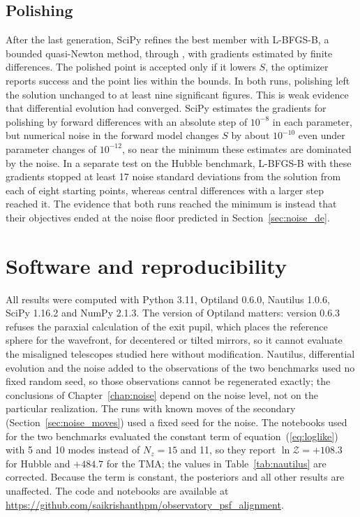 \subsection{Polishing}
After the last generation, SciPy refines the best member with L-BFGS-B, a bounded quasi-Newton method, through , with gradients estimated by finite differences. The polished point is accepted only if it lowers $S$, the optimizer reports success and the point lies within the bounds. In both runs, polishing left the solution unchanged to at least nine significant figures. This is weak evidence that differential evolution had converged. SciPy estimates the gradients for polishing by forward differences with an absolute step of $10^{-8}$ in each parameter, but numerical noise in the forward model changes $S$ by about $10^{-10}$ even under parameter changes of $10^{-12}$, so near the minimum these estimates are dominated by the noise. In a separate test on the Hubble benchmark, L-BFGS-B with these gradients stopped at least 17 noise standard deviations from the solution from each of eight starting points, whereas central differences with a larger step reached it. The evidence that both runs reached the minimum is instead that their objectives ended at the noise floor predicted in Section~\ref{sec:noise_de}.

\section{Software and reproducibility}\label{sec:software}
All results were computed with Python 3.11, Optiland 0.6.0, Nautilus 1.0.6, SciPy 1.16.2 and NumPy 2.1.3. The version of Optiland matters: version 0.6.3 refuses the paraxial calculation of the exit pupil, which places the reference sphere for the wavefront, for decentered or tilted mirrors, so it cannot evaluate the misaligned telescopes studied here without modification. Nautilus, differential evolution and the noise added to the observations of the two benchmarks used no fixed random seed, so those observations cannot be regenerated exactly; the conclusions of Chapter~\ref{chap:noise} depend on the noise level, not on the particular realization. The runs with known moves of the secondary (Section~\ref{sec:noise_moves}) used a fixed seed for the noise. The notebooks used for the two benchmarks evaluated the constant term of equation~(\ref{eq:loglike}) with 5 and 10 modes instead of $N_z=15$ and 11, so they report $\ln\mathcal{Z}=+108.3$ for Hubble and $+484.7$ for the TMA; the values in Table~\ref{tab:nautilus} are corrected. Because the term is constant, the posteriors and all other results are unaffected. The code and notebooks are available at \url{https://github.com/saikrishanthpm/observatory_psf_alignment}.